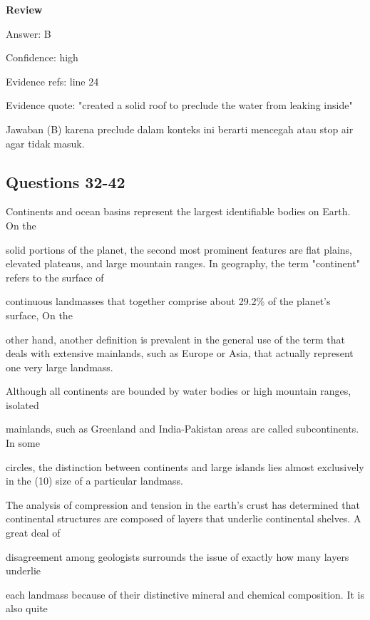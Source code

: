 \documentclass[12pt]{article}
\begin{document}
\par
\begingroup
\setlength{\parskip}{0pt}
\setlength{\parindent}{0pt}
\textbf{Review}\par
Answer: B\par
Confidence: high\par
Evidence refs: line 24\par
Evidence quote: "created a solid roof to preclude the water from leaking inside"\par
Jawaban (B) karena preclude dalam konteks ini berarti mencegah atau stop air agar tidak masuk.\par
\endgroup
\par
\vspace{0.25\baselineskip}
\subsection*{Questions 32-42}
\begingroup
\small
\sloppy
\setlength{\parskip}{0pt}
\setlength{\parindent}{0pt}
Continents and ocean basins represent the largest identifiable bodies on Earth. On the\par
solid portions of the planet, the second most prominent features are flat plains, elevated plateaus, and large mountain ranges. In geography, the term "continent" refers to the surface of\par
continuous landmasses that together comprise about 29.2\% of the planet's surface, On the\par
other hand, another definition is prevalent in the general use of the term that deals with extensive mainlands, such as Europe or Asia, that actually represent one very large landmass.\par
Although all continents are bounded by water bodies or high mountain ranges, isolated\par
mainlands, such as Greenland and India-Pakistan areas are called subcontinents. In some\par
circles, the distinction between continents and large islands lies almost exclusively in the (10) size of a particular landmass.\par
The analysis of compression and tension in the earth's crust has determined that continental structures are composed of layers that underlie continental shelves. A great deal of\par
disagreement among geologists surrounds the issue of exactly how many layers underlie\par
each landmass because of their distinctive mineral and chemical composition. It is also quite\par
\end{document}
